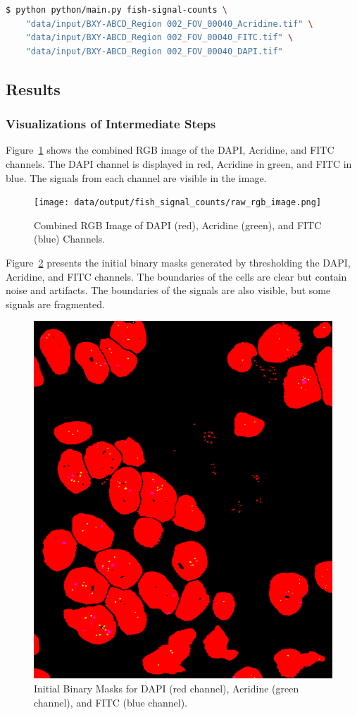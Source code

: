 \documentclass[a4paper,12pt]{article}
\begin{document}
\begin{lstlisting}[language=bash]
$ python python/main.py fish-signal-counts \
    "data/input/BXY-ABCD_Region 002_FOV_00040_Acridine.tif" \
    "data/input/BXY-ABCD_Region 002_FOV_00040_FITC.tif" \
    "data/input/BXY-ABCD_Region 002_FOV_00040_DAPI.tif"
\end{lstlisting}

\subsection{Results}

\subsubsection{Visualizations of Intermediate Steps}

Figure~\ref{fig:raw_rgb_image} shows the combined RGB image of the DAPI, Acridine, and FITC channels. The DAPI channel is displayed in red, Acridine in green, and FITC in blue. The signals from each channel are visible in the image.

\begin{figure}[!htbp]
    \centering
    \texttt{[image: data/output/fish\_signal\_counts/raw\_rgb\_image.png]}
    \caption{Combined RGB Image of DAPI (red), Acridine (green), and FITC (blue) Channels.}
    \label{fig:raw_rgb_image}
\end{figure}

Figure~\ref{fig:cell_binary_masks} presents the initial binary masks generated by thresholding the DAPI, Acridine, and FITC channels. The boundaries of the cells are clear but contain noise and artifacts. The boundaries of the signals are also visible, but some signals are fragmented.

\begin{figure}[!htbp]
    \centering
    \includegraphics[width=0.5\linewidth]{data/output/fish_signal_counts/binary_masks.png}
    \caption{Initial Binary Masks for DAPI (red channel), Acridine (green channel), and FITC (blue channel).}
    \label{fig:cell_binary_masks}
\end{figure}
\end{document}

